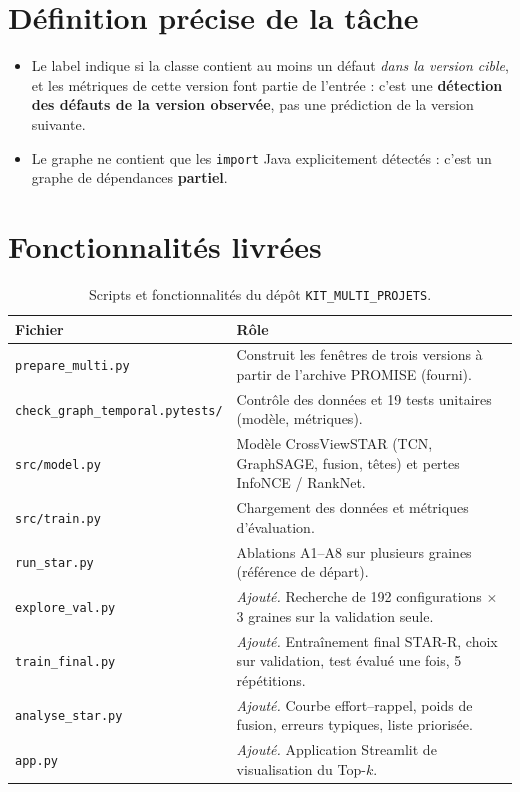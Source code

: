 \documentclass[11pt,a4paper,openany]{report}
\newcommand{\code}[1]{\texttt{\small #1}}
\begin{document}
\section{Définition précise de la tâche}
\begin{warnbox}
\begin{itemize}[leftmargin=1em]
  \item Le label indique si la classe contient au moins un défaut \emph{dans la version cible}, et les métriques
        de cette version font partie de l'entrée : c'est une \textbf{détection des défauts de la version observée},
        pas une prédiction de la version suivante.
  \item Le graphe ne contient que les \code{import} Java explicitement détectés : c'est un graphe de dépendances
        \textbf{partiel}.
\end{itemize}
\end{warnbox}

\section{Fonctionnalités livrées}
\begin{table}[htbp]
\centering\small
\caption{Scripts et fonctionnalités du dépôt \code{KIT\_MULTI\_PROJETS}.}
\label{tab:scripts}
\begin{tabularx}{\linewidth}{>{\raggedright\arraybackslash}p{4.4cm}X}
\toprule
\textbf{Fichier} & \textbf{Rôle} \\
\midrule
\code{prepare\_multi.py} & Construit les fenêtres de trois versions à partir de l'archive PROMISE (fourni). \\
\code{check\_graph\_temporal.py}\newline\code{tests/} & Contrôle des données et 19 tests unitaires (modèle, métriques). \\
\code{src/model.py} & Modèle CrossViewSTAR (TCN, GraphSAGE, fusion, têtes) et pertes InfoNCE / RankNet. \\
\code{src/train.py} & Chargement des données et métriques d'évaluation. \\
\code{run\_star.py} & Ablations A1--A8 sur plusieurs graines (référence de départ). \\
\code{explore\_val.py} & \emph{Ajouté.} Recherche de 192 configurations $\times$ 3 graines sur la validation seule. \\
\code{train\_final.py} & \emph{Ajouté.} Entraînement final STAR-R, choix sur validation, test évalué une fois, 5 répétitions. \\
\code{analyse\_star.py} & \emph{Ajouté.} Courbe effort--rappel, poids de fusion, erreurs typiques, liste priorisée. \\
\code{app.py} & \emph{Ajouté.} Application Streamlit de visualisation du Top-$k$. \\
\bottomrule
\end{tabularx}
\end{table}
\end{document}
